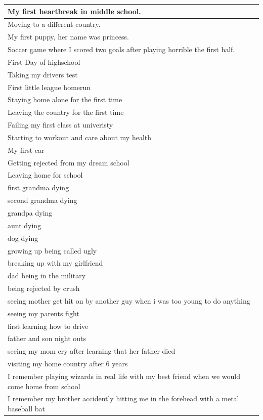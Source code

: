\documentclass[
  .7em,
  letterpaper,
  DIV=11,
  numbers=noendperiod]{scrartcl}
\begin{document}
\begin{table}
\begin{tabular}{l}
\hline
My first heartbreak in middle school.\\
\hline
Moving to a different country.\\
\hline
My first puppy, her name was princess.\\
\hline
Soccer game where I scored two goals after playing horrible the first half.\\
\hline
First Day of highschool\\
\hline
Taking my drivers test\\
\hline
First little league homerun\\
\hline
Staying home alone for the first time\\
\hline
Leaving the country for the first time\\
\hline
Failing my first class at univeristy\\
\hline
Starting to workout and care about my health\\
\hline
My first car\\
\hline
Getting rejected from my dream school\\
\hline
Leaving home for school\\
\hline
first grandma dying\\
\hline
second grandma dying\\
\hline
grandpa dying\\
\hline
aunt dying\\
\hline
dog dying\\
\hline
growing up being called ugly\\
\hline
breaking up with my girlfriend\\
\hline
dad being in the military\\
\hline
being rejected by crush\\
\hline
seeing mother get hit on by another guy when i was too young to do anything\\
\hline
seeing my parents fight\\
\hline
first learning how to drive\\
\hline
father and son night outs\\
\hline
seeing my mom cry after learning that her father died\\
\hline
visiting my home country after 6 years\\
\hline
I remember playing wizards in real life with my best friend when we would come home from school\\
\hline
I remember my brother accidently hitting me in the forehead with a metal baseball bat\\

\end{tabular}
\end{table}
\end{document}
